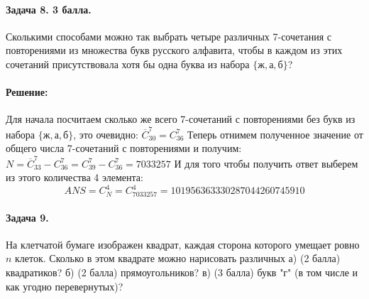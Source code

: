 \documentclass[12pt]{article}
\begin{document}
\paragraph{Задача 8. 3 балла.} Сколькими способами можно так выбрать 
четыре различных 7-со\-че\-та\-ния с повторениями из множества букв русского 
алфавита, чтобы в каждом из этих сочетаний присутствовала хотя бы 
одна буква из набора $ \{\text{ж},\text{а},\text{б}\} $? 

\paragraph{\bf Решение:}
Для начала посчитаем сколько же всего 7-сочетаний с повторениями без букв из набора
$ \{\text{ж},\text{а},\text{б}\} $, это очевидно: $ \overline{C}_{30}^{7} = C_{36}^{7} $
Теперь отнимем полученное значение от общего числа 7-сочетаний с повторениями и получим:
$ N = \overline{C}_{33}^{7} - C_{36}^{7} = C_{39}^{7} - C_{36}^{7} = 7033257$
И для того чтобы получить ответ выберем из этого количества 4 элемента:
$$ ANS = C_N^4 = C_{7033257}^4 = 101956363330287044260745910 $$

\paragraph{Задача 9.} На клетчатой бумаге изображен квадрат, 
каждая сторона которого умещает ровно $ n $ клеток. Сколько 
в этом квадрате можно нарисовать различных а) (2 балла) квадратиков? б)
(2 балла)
прямоугольников? в) (3 балла) букв "г" (в том числе и как угодно перевернутых)? 
\end{document}
